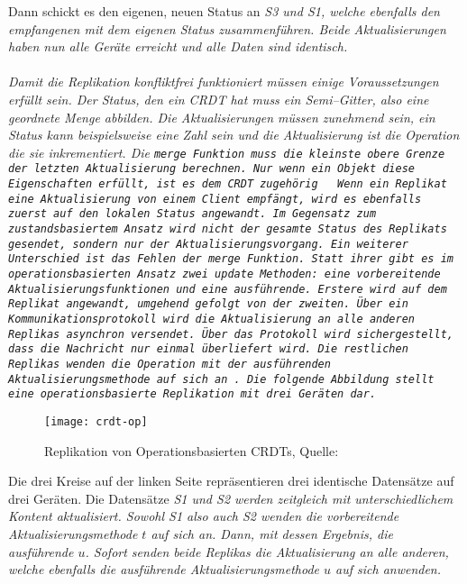 Dann schickt es den eigenen, neuen Status an \it{S3} und \it{S1}, welche ebenfalls den empfangenen mit dem eigenen Status zusammenführen. Beide Aktualisierungen haben nun alle Geräte erreicht und alle Daten sind identisch.\\\\
%
Damit die Replikation konfliktfrei funktioniert müssen einige Voraussetzungen erfüllt sein.
Der Status, den ein \gls{CRDT} hat muss ein Semi--Gitter, also eine geordnete Menge abbilden.
Die Aktualisierungen müssen zunehmend sein, ein Status kann beispielsweise eine Zahl sein und die Aktualisierung ist die Operation die sie inkrementiert.
Die \tt{merge} Funktion muss die kleinste obere Grenze der letzten Aktualisierung berechnen.
Nur wenn ein Objekt diese Eigenschaften erfüllt, ist es dem \gls{CRDT} zugehörig ~\cite{crdt_shapiro2}
%
%
%
Wenn ein Replikat eine Aktualisierung von einem Client empfängt, wird es ebenfalls zuerst auf den lokalen Status angewandt.
Im Gegensatz zum zustandsbasiertem Ansatz wird nicht der gesamte Status des Replikats gesendet, sondern nur der Aktualisierungsvorgang.
Ein weiterer Unterschied ist das Fehlen der \tt{merge} Funktion. Statt ihrer gibt es im operationsbasierten Ansatz zwei \tt{update} Methoden: eine vorbereitende Aktualisierungsfunktionen und eine ausführende. Erstere wird auf dem Replikat angewandt, umgehend gefolgt von der zweiten.
Über ein Kommunikationsprotokoll wird die Aktualisierung an alle anderen Replikas asynchron versendet.
Über das Protokoll wird sichergestellt, dass die Nachricht nur einmal überliefert wird.
Die restlichen Replikas wenden die Operation mit der ausführenden Aktualisierungsmethode auf sich an~\cite{crdt_shapiro2}.
Die folgende Abbildung stellt eine operationsbasierte Replikation mit drei Geräten dar.
%
\begin{figure}[H]
  \centering
  \texttt{[image: crdt-op]}
  \grayRule
  \caption[Replikation von Operationsbasierten \gls{CRDT}]{Replikation von Operationsbasierten \glspl{CRDT}, Quelle: ~\cite{crdt_shapiro2}}
  \label{fig:crdt-op}
\end{figure}
%
Die drei Kreise auf der linken Seite repräsentieren drei identische Datensätze auf drei Geräten. Die Datensätze \it{S1} und \it{S2} werden zeitgleich mit unterschiedlichem Kontent aktualisiert.
Sowohl \it{S1} also auch \it{S2} wenden die vorbereitende Aktualisierungsmethode $t$ auf sich an.
Dann, mit dessen Ergebnis, die ausführende $u$.
Sofort senden beide Replikas die Aktualisierung an alle anderen, welche ebenfalls die ausführende Aktualisierungsmethode $u$ auf sich anwenden.\\\\
